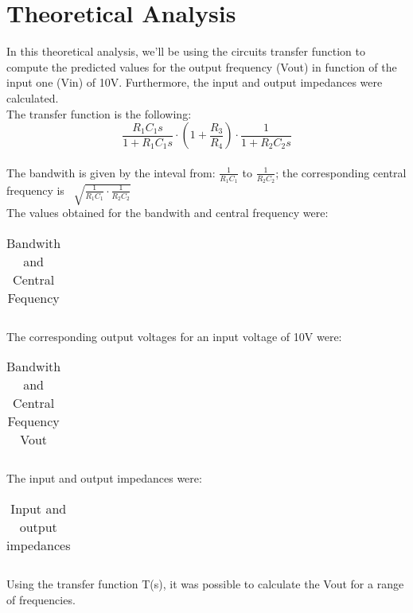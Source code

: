 \section{Theoretical Analysis}
\label{sec:analysis}

In this theoretical analysis, we'll be using the circuits transfer function to compute the predicted values for the output frequency (Vout) in function of the input one (Vin) of 10V. Furthermore, the input and output impedances were calculated.\\
The transfer function is the following: \[\frac{R_1C_1s}{1+R_1C_1s} \cdot (1+\frac{R_3}{R_4}) \cdot \frac{1}{1+R_2C_2s}\] \\

The bandwith is given by the inteval from: $\frac{1}{R_1C_1}$ to $\frac{1}{R_2C_2}$; the corresponding central frequency is \ $\sqrt{{\frac{1}{R_1C_1} \cdot \frac{1}{R_2C_2}}}$\\

The values obtained for the bandwith and central frequency were:

\FloatBarrier
\begin{table}[h]
  \centering
  \begin{tabular}{|c|c|}
    \hline    
    
    \hline
  \end{tabular}
  \caption{Bandwith and Central Fequency}
  \label{tab:Octave_cent}
\end{table}
\FloatBarrier

The corresponding output voltages for an input voltage of 10V were:
\FloatBarrier
\begin{table}[h]
  \centering
  \begin{tabular}{|c|c|}
    \hline    
    
    \hline
  \end{tabular}
  \caption{Bandwith and Central Fequency Vout}
  \label{tab:Octave_cent}
\end{table}

\FloatBarrier

The input and output impedances were:
\FloatBarrier
\begin{table}[h]
  \centering
  \begin{tabular}{|c|c|c|}
    \hline    
    
    \hline
  \end{tabular}
  \caption{Input and output impedances}
  \label{tab:Octave_cent}
\end{table}
\FloatBarrier

Using the transfer function T(s), it was possible to calculate the Vout for a range of frequencies.

